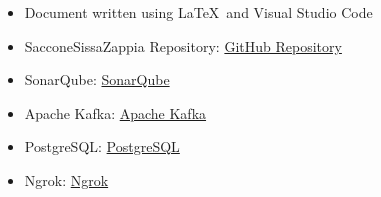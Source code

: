 \clearpage
{}
\label{sect:installation_setup}

\clearpage
{}
\label{sect:acceptance_testing}

\clearpage
{}
\label{sect:additional}

\clearpage
{}
\label{sect:effort}

\clearpage
{}


\begin{itemize}
        \item Document written using \LaTeX  \ and Visual Studio Code
        \item SacconeSissaZappia Repository: \href{https://github.com/alessandrosaccone/SacconeSissaZappia}{GitHub Repository}
        \item SonarQube: \href{https://www.sonarqube.org/}{SonarQube}
        \item Apache Kafka: \href{https://kafka.apache.org/}{Apache Kafka}
        \item PostgreSQL: \href{https://www.postgresql.org/}{PostgreSQL}
        \item Ngrok: \href{https://ngrok.com/}{Ngrok}
\end{itemize}

